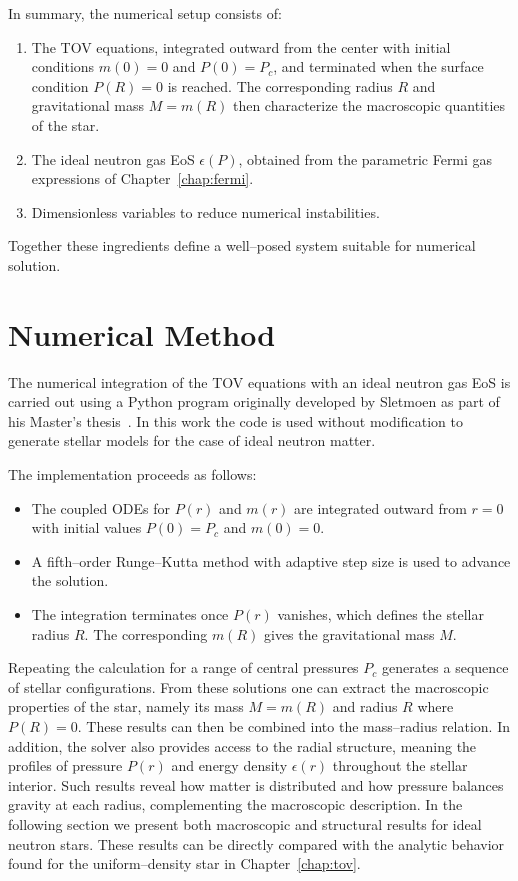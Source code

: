 In summary, the numerical setup consists of:
\begin{enumerate}
  \item The TOV equations, integrated outward from the center with 
  initial conditions $m(0)=0$ and $P(0)=P_c$, and terminated when 
  the surface condition $P(R)=0$ is reached. The corresponding 
  radius $R$ and gravitational mass $M=m(R)$ then characterize 
  the macroscopic quantities of the star.
  \item The ideal neutron gas EoS $\epsilon(P)$, obtained from the
  parametric Fermi gas expressions of Chapter~\ref{chap:fermi}.
  \item Dimensionless variables to reduce numerical instabilities.
\end{enumerate}
Together these ingredients define a well--posed system suitable for
numerical solution.

\section{Numerical Method}

The numerical integration of the TOV equations with an ideal neutron
gas EoS is carried out using a Python program originally developed by
Sletmoen as part of his Master's thesis~\cite{sletmoen2022}.
In this work the code is used without modification to generate stellar
models for the case of ideal neutron matter.

The implementation proceeds as follows:
\begin{itemize}
  \item The coupled ODEs for $P(r)$ and $m(r)$ are integrated outward
  from $r=0$ with initial values $P(0)=P_c$ and $m(0)=0$.
  \item A fifth--order Runge--Kutta method with adaptive step size is used to
  advance the solution.
  \item The integration terminates once $P(r)$ vanishes, which defines
  the stellar radius $R$. The corresponding $m(R)$ gives the
  gravitational mass $M$.
\end{itemize}
Repeating the calculation for a range of central pressures $P_c$
generates a sequence of stellar configurations. From these solutions
one can extract the macroscopic properties of the star, namely its mass
$M=m(R)$ and radius $R$ where $P(R)=0$. These results can then be
combined into the mass--radius relation. In addition, the solver also
provides access to the radial structure, meaning the profiles
of pressure $P(r)$ and energy density $\epsilon(r)$ throughout the
stellar interior. Such results reveal how matter is distributed
and how pressure balances gravity at each radius, complementing the
macroscopic description. In the following section we present both
macroscopic and structural results for ideal neutron stars.
These results can be directly compared with the analytic behavior found
for the uniform--density star in Chapter~\ref{chap:tov}.

